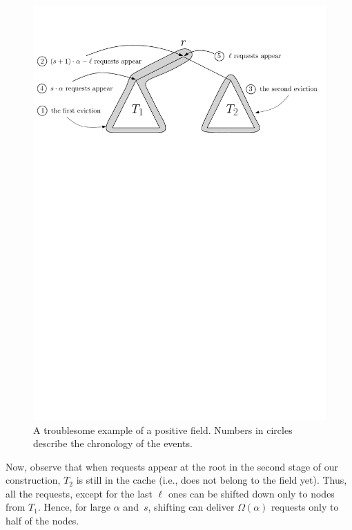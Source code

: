 \begin{figure}[t]
  \centering
  \includegraphics[width=0.9\columnwidth,keepaspectratio]{images/example}
  \caption{A troublesome example of a positive field. Numbers in circles describe 
  the chronology of the events.}
  \label{fig:trbl_exmpl}
\end{figure}


Now, observe that when requests appear at the root in the second stage of our
construction, $T_2$ is still in the cache (i.e., does not belong to the field
yet). Thus, all the requests, except for the last $\ell$ ones can be shifted
down only to nodes from $T_1$. Hence, for large $\alpha$ and~$s$, shifting can
deliver $\Omega(\alpha)$ requests only to half of the nodes.


